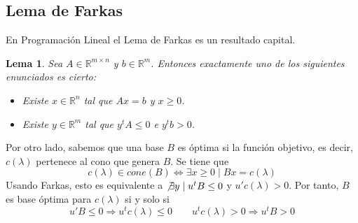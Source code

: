 \documentclass[twoside,a4paper,openright,12pt,tikz]{book}
\newtheorem{lem}{Lema}[section]
\newcommand{\R}{\mathbb{R}}
\begin{document}
\subsection{Lema de Farkas}
En Programación Lineal el Lema de Farkas es un resultado capital. 
\begin{lem}
Sea $A\in\R^{m\times n}$ y $b\in \R^m$. Entonces exactamente uno de los siguientes enunciados es cierto:
\begin{itemize}
\item Existe $x\in\R^n$ tal que $Ax=b$ y $x\geq 0$.
\item Existe $y\in \R^m$ tal que $y^t A \leq0$ e $y^t b>0$. 
\end{itemize}
\end{lem}
Por otro lado, sabemos que una base $B$ es óptima si la función objetivo, es decir, $c(\lambda)$ pertenece al cono que genera $B$. Se tiene que
$$
c(\lambda) \in cone(B) \Leftrightarrow \exists x\geq0 \mid Bx = c(\lambda) 
$$  
Usando Farkas, esto es equivalente a $\not\exists y \mid u^tB \leq 0$ y $u'c(\lambda)>0$. Por tanto, $B$ es base óptima para $c(\lambda)$ si y solo si
$$u'B \leq 0 \Rightarrow u^t c(\lambda) \leq 0 \qquad u^t c(\lambda)>0 \Rightarrow u^tB >0$$
\end{document}
